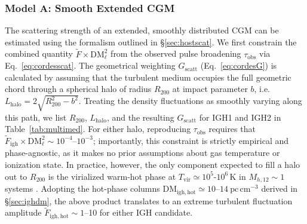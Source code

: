 \documentclass[twocolumn, linenumbers, tra]{aastex631}
\begin{document}
\subsubsection{\texorpdfstring{Model A: {Smooth} Extended CGM}{}}\label{sec:extmed}

{The scattering strength of an extended, smoothly distributed CGM can be estimated using the formalism outlined in \S\ref{sec:hostscat}. We first constrain the combined quantity $\widetilde{F}\times\mathrm{DM}_{\ell}^{2}$ from the observed pulse broadening $\tau_{\mathrm{obs}}$ via Eq.~\ref{eq:cordesscat}. The geometrical weighting $G_{\mathrm{scatt}}$ (Eq.~\ref{eq:cordesG}) is calculated by assuming that the turbulent medium occupies the full geometric chord through a spherical halo of radius $R_{200}$ at impact parameter $b$, i.e.\ $L_{\mathrm{halo}} = 2\sqrt{R_{200}^{2}-b^{2}}$. Treating the density fluctuations as smoothly varying along this path, we list $R_{200}$, $L_{\mathrm{halo}}$, and the resulting $G_{\mathrm{scatt}}$ for IGH1 and IGH2 in Table~\ref{tab:multimed}. For either halo, reproducing $\tau_{\mathrm{obs}}$ requires that $\widetilde{F}_{\mathrm{igh}}\times\mathrm{DM}_{\ell}^{2} \sim 10^{-4}$--$10^{-3}$; importantly, this constraint is strictly empirical and phase-agnostic, as it makes no prior assumptions about gas temperature or ionization state. In practice, however, the only component expected to fill a halo out to $R_{200}$ is the virialized warm-hot phase at $T_{\mathrm{vir}} \simeq 10^{5}$-$10^{6}\,$K in $M_{h,12} \sim 1$ systems \citep{Tumlinson2017,Qu2018}. Adopting the hot-phase columns $\mathrm{DM}_{\mathrm{igh, hot}} \simeq 10$--$14\ \mathrm{pc\,cm^{-3}}$ derived in \S\ref{sec:ighdm}, the above product translates to an extreme turbulent fluctuation amplitude $\widetilde{F}_{\mathrm{igh, hot}} \sim 1$--10 for either IGH candidate. 

}
\end{document}
